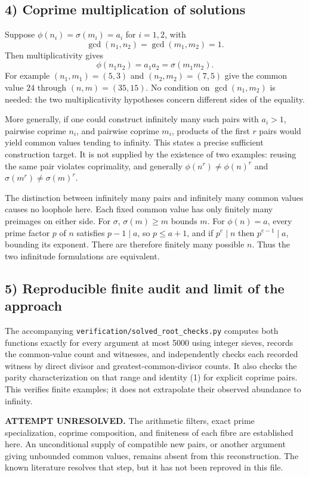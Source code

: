 \subsection*{4) Coprime multiplication of solutions}
Suppose $\phi(n_i)=\sigma(m_i)=a_i$ for $i=1,2$, with
\[
 \gcd(n_1,n_2)=\gcd(m_1,m_2)=1.
\]
Then multiplicativity gives
\[
 \phi(n_1n_2)=a_1a_2=\sigma(m_1m_2).\tag{1}
\]
For example $(n_1,m_1)=(5,3)$ and $(n_2,m_2)=(7,5)$ give the common value $24$ through $(n,m)=(35,15)$. No condition on $\gcd(n_1,m_2)$ is needed: the two multiplicativity hypotheses concern different sides of the equality.

More generally, if one could construct infinitely many such pairs with $a_i>1$, pairwise coprime $n_i$, and pairwise coprime $m_i$, products of the first $r$ pairs would yield common values tending to infinity. This states a precise sufficient construction target. It is not supplied by the existence of two examples: reusing the same pair violates coprimality, and generally $\phi(n^r)\ne\phi(n)^r$ and $\sigma(m^r)\ne\sigma(m)^r$.

The distinction between infinitely many pairs and infinitely many common values causes no loophole here. Each fixed common value has only finitely many preimages on either side. For $\sigma$, $\sigma(m)\ge m$ bounds $m$. For $\phi(n)=a$, every prime factor $p$ of $n$ satisfies $p-1\mid a$, so $p\le a+1$, and if $p^e\mid n$ then $p^{e-1}\mid a$, bounding its exponent. There are therefore finitely many possible $n$. Thus the two infinitude formulations are equivalent.

\subsection*{5) Reproducible finite audit and limit of the approach}
The accompanying \texttt{verification/solved\_root\_checks.py} computes both functions exactly for every argument at most 5000 using integer sieves, records the common-value count and witnesses, and independently checks each recorded witness by direct divisor and greatest-common-divisor counts. It also checks the parity characterization on that range and identity (1) for explicit coprime pairs. This verifies finite examples; it does not extrapolate their observed abundance to infinity.

\textbf{ATTEMPT UNRESOLVED.} The arithmetic filters, exact prime specialization, coprime composition, and finiteness of each fibre are established here. An unconditional supply of compatible new pairs, or another argument giving unbounded common values, remains absent from this reconstruction. The known literature resolves that step, but it has not been reproved in this file.


